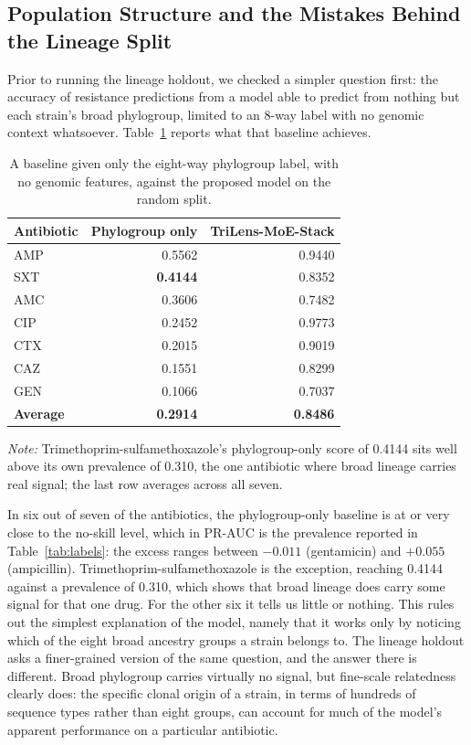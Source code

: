 \FloatBarrier
\subsection{Population Structure and the Mistakes Behind the Lineage Split}

Prior to running the lineage holdout, we checked a simpler question first: the accuracy of
resistance predictions from a model able to predict from nothing but each strain's broad
phylogroup, limited to an 8-way label with no genomic context whatsoever.
Table~\ref{tab:phylogroup} reports what that baseline achieves.

\begin{table}[htb]
\centering
\caption{A baseline given only the eight-way phylogroup label, with no genomic
features, against the proposed model on the random split.}
\label{tab:phylogroup}
\small
\begin{tabular}{|l|r|r|}
\hline
\textbf{Antibiotic} & \textbf{Phylogroup only} & \textbf{TriLens-MoE-Stack} \\ \hline
AMP & 0.5562 & 0.9440 \\ \hline
SXT & \textbf{0.4144} & 0.8352 \\ \hline
AMC & 0.3606 & 0.7482 \\ \hline
CIP & 0.2452 & 0.9773 \\ \hline
CTX & 0.2015 & 0.9019 \\ \hline
CAZ & 0.1551 & 0.8299 \\ \hline
GEN & 0.1066 & 0.7037 \\ \hline
\textbf{Average} & \textbf{0.2914} & \textbf{0.8486} \\ \hline
\end{tabular}
\vspace{0.4em}

\noindent\footnotesize\textit{Note:} Trimethoprim-sulfamethoxazole's phylogroup-only score of
0.4144 sits well above its own prevalence of 0.310, the one antibiotic where broad lineage
carries real signal; the last row averages across all seven.
\end{table}

In six out of seven of the antibiotics, the phylogroup-only baseline is at or very close to the
no-skill level, which in PR-AUC is the prevalence reported in Table~\ref{tab:labels}: the excess
ranges between $-0.011$ (gentamicin) and $+0.055$ (ampicillin). Trimethoprim-sulfamethoxazole is
the exception, reaching 0.4144 against a prevalence of 0.310, which shows that broad lineage does
carry some signal for that one drug. For the other six it tells us little or nothing. This rules
out the simplest explanation of the model, namely that it works only by noticing which of the
eight broad ancestry groups a strain belongs to. The lineage holdout asks a finer-grained version
of the same question, and the answer there is different. Broad phylogroup carries virtually no signal, but fine-scale relatedness
clearly does: the specific clonal origin of a strain, in terms of hundreds of sequence types rather
than eight groups, can account for much of the model's apparent performance on a particular
antibiotic.

